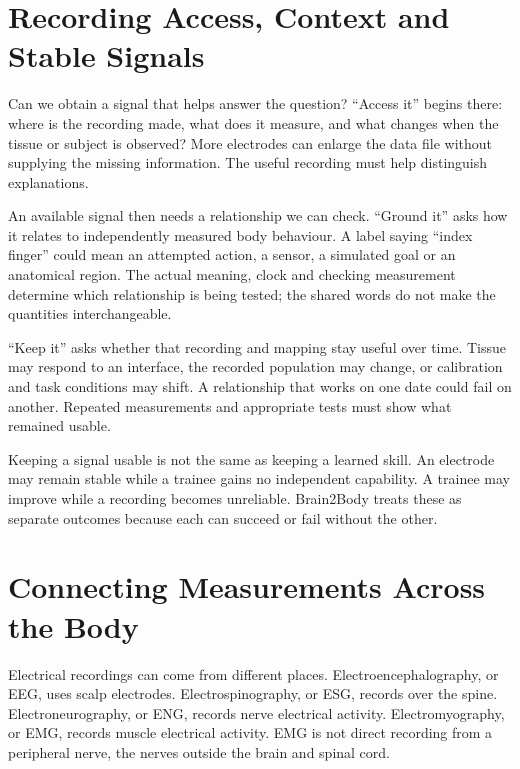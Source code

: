\section{Recording Access, Context and Stable Signals}

Can we obtain a signal that helps answer the question? ``Access it'' begins
there: where is the recording made, what does it measure, and what changes when
the tissue or subject is observed? More electrodes can enlarge the data file
without supplying the missing information. The useful recording must help
distinguish explanations.\par

An available signal then needs a relationship we can check. ``Ground it'' asks
how it relates to independently measured body behaviour. A label saying ``index
finger'' could mean an attempted action, a sensor, a simulated goal or an
anatomical region. The actual meaning, clock and checking measurement determine
which relationship is being tested; the shared words do not make the quantities
interchangeable.\par

``Keep it'' asks whether that recording and mapping stay useful over time.
Tissue may respond to an interface, the recorded population may change, or
calibration and task conditions may shift. A relationship that works on one
date could fail on another. Repeated measurements and appropriate tests must
show what remained usable.\par

Keeping a signal usable is not the same as keeping a learned skill. An electrode may remain stable while a trainee gains no independent capability. A trainee may improve while a recording becomes unreliable. Brain2Body treats these as separate outcomes because each can succeed or fail without the other.\par

\section{Connecting Measurements Across the Body}

Electrical recordings can come from different places. Electroencephalography, or EEG, uses scalp electrodes. Electrospinography, or ESG, records over the spine. Electroneurography, or ENG, records nerve electrical activity. Electromyography, or EMG, records muscle electrical activity. EMG is not direct recording from a peripheral nerve, the nerves outside the brain and spinal cord.\par

